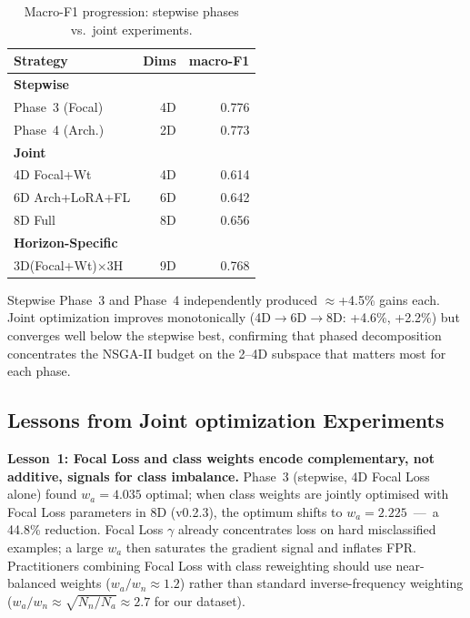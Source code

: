 ﻿\documentclass[twocolumn]{article}
\begin{document}
\begin{table}
\centering
\caption{Macro-F1 progression: stepwise phases vs.\ joint experiments.}
\label{tab:phase_summary}
\small
\renewcommand{\arraystretch}{1.1}
\setlength{\tabcolsep}{3pt}
\begin{tabular}{lrr}
\toprule
\textbf{Strategy} & \textbf{Dims} & \textbf{macro-F1} \\
\midrule
\textbf{Stepwise} & & \\
\quad Phase~3 (Focal) & 4D & 0.776 \\
\quad Phase~4 (Arch.) & 2D & 0.773 \\
\textbf{Joint} & & \\
\quad 4D Focal+Wt & 4D & 0.614 \\
\quad 6D Arch+LoRA+FL & 6D & 0.642 \\
\quad 8D Full & 8D & 0.656 \\
\textbf{Horizon-Specific} & & \\
\quad 3D(Focal+Wt)$\times$3H & 9D & 0.768 \\

\bottomrule
\end{tabular}
\end{table}

Stepwise Phase~3 and Phase~4 independently produced
$\approx$+4.5\% gains each.
Joint optimization improves monotonically (4D$\to$6D$\to$8D:
+4.6\%, +2.2\%) but converges well below the stepwise best,
confirming that phased decomposition concentrates the NSGA-II
budget on the 2--4D subspace that matters most for each phase.

\subsection{Lessons from Joint optimization Experiments}
\label{subsec:joint_lessons}

\textbf{Lesson~1: Focal Loss and class weights encode complementary,
not additive, signals for class imbalance.}
Phase~3 (stepwise, 4D Focal Loss alone) found $w_a{=}4.035$ optimal;
when class weights are jointly optimised with Focal Loss parameters in
8D (v0.2.3), the optimum shifts to $w_a{=}2.225$~---~a 44.8\% reduction.
Focal Loss $\gamma$ already concentrates loss on hard misclassified
examples; a large $w_a$ then saturates the gradient signal and inflates
FPR.
Practitioners combining Focal Loss with class reweighting should use
near-balanced weights ($w_a / w_n \approx 1.2$) rather than
standard inverse-frequency weighting
($w_a / w_n \approx \sqrt{N_n/N_a} \approx 2.7$ for our dataset).
\end{document}

